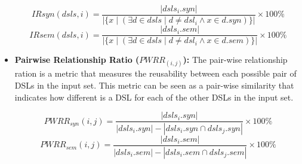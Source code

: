 \begin{itemize}
\begin{equation}
  IR{syn}(dsls,i) = \frac{|dsls_i.syn|}{|\{x \mid (\exists d \in dsls \mid d \neq dsl_i \wedge x \in d.syn)\}|} \times 100\%
\end{equation}
\vspace{-1mm}
\begin{equation}
  IR{sem}(dsls,i) = \frac{|dsls_i.sem|}{|\{x \mid (\exists d \in dsls \mid d \neq dsl_i \wedge x \in d.sem)\}|} \times 100\%
\end{equation}

\vspace{2mm}
\item \textbf{Pairwise Relationship Ratio ($PWRR_{(i,j)}$):} The pair-wise relationship ration is a metric that measures the reusability between each possible pair of DSLs in the input set. This metric can be seen as a pair-wise similarity that indicates how different is a DSL for each of the other DSLs in the input set.

\begin{equation}
  PWRR_{syn}(i,j) = \frac{|dsls_i.syn|}{|dsls_i.syn| - |dsls_i.syn \cap dsls_j.syn|} \times 100\%
\end{equation}
\vspace{-1mm}
\begin{equation}
  PWRR_{sem}(i,j) = \frac{|dsls_i.sem|}{|dsls_i.sem| - |dsls_i.sem \cap dsls_j.sem|} \times 100\%
\end{equation}
\end{itemize}
